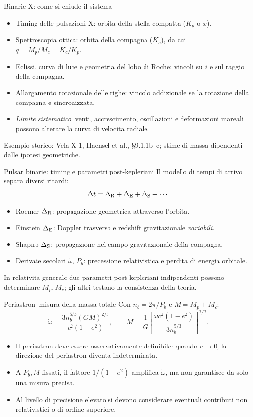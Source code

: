 \begin{frame}[t]{Binarie X: come si chiude il sistema}
\small
\begin{itemize}
\item Timing delle pulsazioni X: orbita della stella compatta ($K_p$ o $x$).
\item Spettroscopia ottica: orbita della compagna ($K_c$), da cui $q=M_p/M_c=K_c/K_p$.
\item Eclissi, curva di luce e geometria del lobo di Roche: vincoli su $i$ e sul raggio della compagna.
\item Allargamento rotazionale delle righe: vincolo addizionale se la rotazione della compagna e sincronizzata.
\item \emph{Limite sistematico}: venti, accrescimento, oscillazioni e deformazioni mareali possono alterare la curva di velocita radiale.
\end{itemize}
\medskip\footnotesize Esempio storico: Vela X-1, Haensel et al., \S9.1.1b--c; stime di massa dipendenti dalle ipotesi geometriche.
\end{frame}

\begin{frame}[t]{Pulsar binarie: timing e parametri post-kepleriani}
\small
Il modello di tempi di arrivo separa diversi ritardi:
\[
\Delta t=\Delta_{\rm R}+\Delta_{\rm E}+\Delta_{\rm S}+\cdots
\]
\begin{itemize}
\item Roemer $\Delta_{\rm R}$: propagazione geometrica attraverso l'orbita.
\item Einstein $\Delta_{\rm E}$: Doppler trasverso e redshift gravitazionale \emph{variabili}.
\item Shapiro $\Delta_{\rm S}$: propagazione nel campo gravitazionale della compagna.
\item Derivate secolari $\dot\omega$, $\dot P_b$: precessione relativistica e perdita di energia orbitale.
\end{itemize}
\medskip
In relativita generale due parametri post-kepleriani indipendenti possono determinare $M_p,M_c$; gli altri testano la consistenza della teoria.
\end{frame}

\begin{frame}[t]{Periastron: misura della massa totale}
\small
Con $n_b=2\pi/P_b$ e $M=M_p+M_c$:
\[
\dot\omega=\frac{3n_b^{5/3}(GM)^{2/3}}{c^2(1-e^2)},
\qquad
M=\frac1G\left[\frac{\dot\omega c^2(1-e^2)}{3n_b^{5/3}}\right]^{3/2}.
\]
\begin{itemize}
\item Il periastron deve essere osservativamente definibile: quando $e\to0$, la direzione del periastron diventa indeterminata.
\item A $P_b,M$ fissati, il fattore $1/(1-e^2)$ amplifica $\dot\omega$, ma non garantisce da solo una misura precisa.
\item Al livello di precisione elevato si devono considerare eventuali contributi non relativistici o di ordine superiore.
\end{itemize}
\end{frame}

